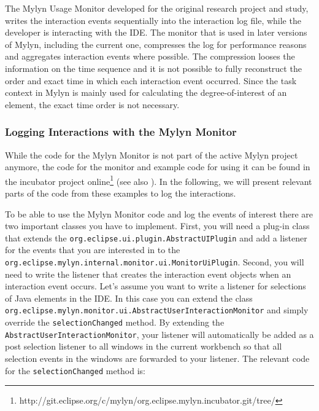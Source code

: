 The Mylyn Usage Monitor developed for the original research project and study, writes the interaction events sequentially into the interaction log file, while the developer is interacting with the IDE. The monitor that is used in later versions of Mylyn, including the current one, compresses the log for performance reasons and aggregates interaction events where possible. The compression looses the information on the time sequence and it is not possible to fully reconstruct the order and exact time in which each interaction event occurred. Since the task context in Mylyn is mainly used for calculating the degree-of-interest of an element, the exact time order is not necessary.


\subsubsection{Logging Interactions with the Mylyn Monitor}
While the code for the Mylyn Monitor is not part of the active Mylyn project anymore, the code for the monitor and example code for using it can be found in the incubator project online\footnote{http://git.eclipse.org/c/mylyn/org.eclipse.mylyn.incubator.git/tree/} (see also \cite{mylyn-monitor}). In the following, we will present relevant parts of the code from these examples to log the interactions.

To be able to use the Mylyn Monitor code and log the events of interest there are two important classes you have to implement. First, you will need a plug-in class that extends the \texttt{org.eclipse.ui.plugin.AbstractUIPlugin} and add a listener for the events that you are interested in to the \texttt{org.eclipse.mylyn.internal.monitor.ui.MonitorUiPlugin}. Second, you will need to write the listener that creates the interaction event objects when an interaction event occurs. Let's assume you want to write a listener for selections of Java elements in the IDE. In this case you can extend the class \texttt{org.eclipse.mylyn.monitor.ui.AbstractUserInteractionMonitor} and simply override the \texttt{selectionChanged} method. By extending the \texttt{AbstractUserInteractionMonitor}, your listener will automatically be added as a post selection listener to all windows in the current workbench so that all selection events in the windows are forwarded to your listener. The relevant code for the \texttt{selectionChanged} method is:



